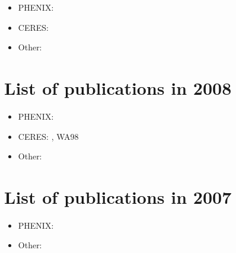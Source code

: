 \documentclass[12pt]{article}
\begin{document}
\begin{itemize}
\item PHENIX:
\cite{
Afanasiev:2009wq,
Afanasiev:2009aa,
Afanasiev:2009ii,
Adare:2009ic,
Adare:2009vd,
Afanasiev:2009hy,
Adare:2008qb,
Adare:2008aa,
Adare:2008ac,
Rak:2009zz}

\item CERES:
\cite{
Adamova:2009ah,
:2009yd}

\item Other:
\cite{Rak:2009zz}

\end{itemize}


\section{List of publications in 2008}

\begin{itemize}
\item PHENIX:
\cite{
Adare:2007vu,
Adare:2008ns,
:2008cx,
:2008cqb,
Adare:2008qa,
Adare:2008cg,
Adare:2008sh,
Afanasiev:2007kk,
Afanasiev:2007wi,
:2007by}

\item CERES:
\cite{
Adamova:2008hs,
Adamova:2008sx,
:2008rp}, WA98
\cite{Aggarwal:2007gw}

\item Other:
\cite{Kim:2008zz,Rak:2007ky}

\end{itemize}


\section{List of publications in 2007}

\begin{itemize}
\item PHENIX:
\cite{
longPRC:2006sc,
Adler:2005xv,
Adare:2006ti,
:2007xw,
Adare:2007dg,
Adler:2007fj,
Afanasiev:2007tv,
Adler:2006hy,
Adare:2006ns,
Adare:2006nr,
Adare:2006nq,
Adare:2006nn,
Adare:2006kf,
Adler:2006bw,
Adler:2006bv,
Adler:2006wg,
Adler:2006yu,
Adler:2006as}
\item Other:
\cite{Rak:2007qa,Rak:2006zi}

\end{itemize}


\end{document}
